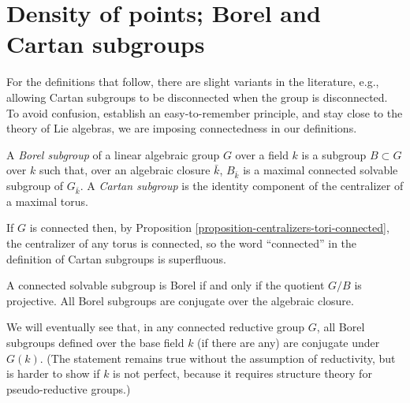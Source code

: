\section{Density of points; Borel and Cartan subgroups}
\label{section-Cartan-Borel-group}

For the definitions that follow, there are slight variants in the literature, e.g., allowing Cartan subgroups to be disconnected when the group is disconnected. To avoid confusion, establish an easy-to-remember principle, and stay close to the theory of Lie algebras, we are imposing connectedness in our definitions.


\begin{definition}
\label{definition-Cartan-Borel-subgroup}
A {\it Borel subgroup} of a linear algebraic group $G$ over a field $k$ is a subgroup $B\subset G$ over $k$ such that, over an algebraic closure $\bar k$, $B_{\bar k}$ is a maximal connected solvable subgroup of $G_{\bar k}$. A {\it Cartan subgroup} is the identity component of the centralizer of a maximal torus. 
\end{definition}

\begin{remark}
 \label{remark-Cartan-connected}
If $G$ is connected then, by Proposition \ref{proposition-centralizers-tori-connected}, the centralizer of any torus is connected, so the word ``connected'' in the definition of Cartan subgroups is superfluous.
\end{remark}



\begin{theorem}
\label{theorem-Borel-subgroups-conjugate}
A connected solvable subgroup is Borel if and only if the quotient $G/B$ is projective. All Borel subgroups are conjugate over the algebraic closure.
\end{theorem}

We will eventually see that, in any connected reductive group $G$, all Borel subgroups defined over the base field $k$ (if there are any) are conjugate under $G(k)$. (The statement remains true without the assumption of reductivity, but is  harder to show if $k$ is not perfect, because it requires structure theory for pseudo-reductive groups.)

